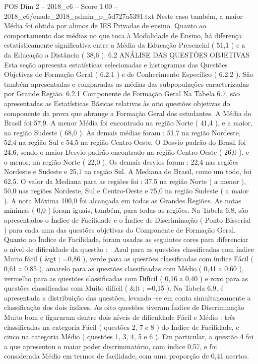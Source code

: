 \begin{textsample}{POS Dim 2 – 2018\_c6 – Score 1.00 – 2018\_c6/enade\_2018\_admin\_p\_5d727a5391.txt}
Neste caso também, a maior Média foi obtida por alunos de IES Privadas de ensino.
Quanto ao comportamento das médias no que toca à Modalidade de Ensino, há diferença estatisticamente significativa entre a Média da Educação Presencial ( 51,1 ) e a da Educação a Distância ( 38,6 ). 6.2 ANÁLISE DAS QUESTÕES OBJETIVAS Esta seção apresenta estatísticas selecionadas e histogramas das Questões Objetivas de Formação Geral ( 6.2.1 ) e de Conhecimento Específico ( 6.2.2 ).
São também apresentadas e comparadas as médias das subpopulações caracterizadas por Grande Região. 6.2.1 Componente de Formação Geral Na Tabela 6.7, são apresentadas as Estatísticas Básicas relativas às oito questões objetivas do componente da prova que abrange a Formação Geral dos estudantes.
A Média do Brasil foi 57,9.
A menor Média foi encontrada na região Norte ( 41,4 ), e a maior, na região Sudeste ( 68,0 ).
As demais médias foram : 51,7 na região Nordeste, 52,4 na região Sul e 54,5 na região Centro-Oeste.
O Desvio padrão do Brasil foi 24,6, sendo o maior Desvio padrão encontrado na região Centro-Oeste ( 26,0 ), e o menor, na região Norte ( 22,0 ).
Os demais desvios foram : 22,4 nas regiões Nordeste e Sudeste e 25,1 na região Sul.
A Mediana do Brasil, como um todo, foi 62,5.
O valor da Mediana para as regiões foi : 37,5 na região Norte ( a menor ), 50,0 nas regiões Nordeste, Sul e Centro-Oeste e 75,0 na região Sudeste ( a maior ).
A nota Máxima 100,0 foi alcançada em todas as Grandes Regiões.
As notas mínimas ( 0,0 ) foram iguais, também, para todas as regiões.
Na Tabela 6.8, são apresentados o Índice de Facilidade e o Índice de Discriminação ( Ponto-Bisserial ) para cada uma das questões objetivas do Componente de Formação Geral.
Quanto ao Índice de Facilidade, foram usadas as seguintes cores para diferenciar o nível de dificuldade da questão :  Azul para as questões classificadas com índice Muito fácil ( \&gt ; =0,86 ), verde para as questões classificadas com índice Fácil ( 0,61 a 0,85 ), amarelo para as questões classificadas com Médio ( 0,41 a 0,60 ), vermelho para as questões classificadas com Difícil ( 0,16 a 0,40 ) e roxo para as questões classificadas com Muito difícil ( \&lt ; =0,15 ).
Na Tabela 6.9, é apresentada a distribuição das questões, levando -se em conta simultaneamente a classificação dos dois índices.
As oito questões tiveram Índice de Discriminação Muito bom e figuraram dentre dois níveis de dificuldade Fácil e Médio : três classificadas na categoria Fácil ( questões 2, 7 e 8 ) do Índice de Facilidade, e cinco na categoria Médio ( questões 1, 3, 4, 5 e 6 ).
Em particular, a questão 4 foi a que apresentou o maior poder discriminatório, com índice 0,57, e foi considerada Médio em termos de facilidade, com uma proporção de 0,41 acertos.

\end{textsample}
